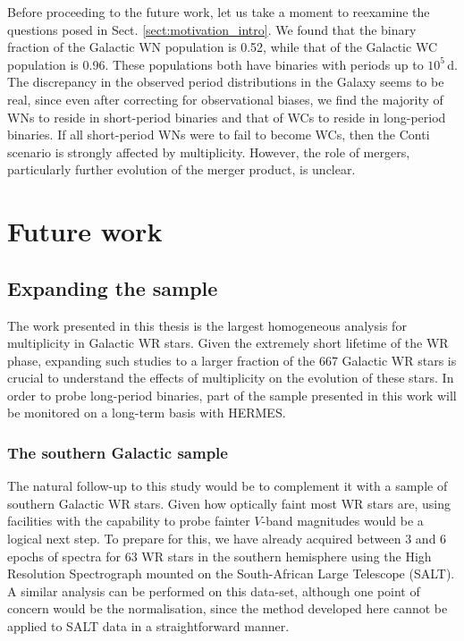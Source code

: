 Before proceeding to the future work, let us take a moment to reexamine the questions posed in Sect. \ref{sect:motivation_intro}. We found that the binary fraction of the Galactic WN population is 0.52, while that of the Galactic WC population is 0.96. These populations both have binaries with periods up to $10^5\,$d. The discrepancy in the observed period distributions in the Galaxy seems to be real, since even after correcting for observational biases, we find the majority of WNs to reside in short-period binaries and that of WCs to reside in long-period binaries. If all short-period WNs were to fail to become WCs, then the Conti scenario is strongly affected by multiplicity. However, the role of mergers, particularly further evolution of the merger product, is unclear. 

\section{Future work}

\subsection{Expanding the sample}

The work presented in this thesis is the largest homogeneous analysis for multiplicity in Galactic WR stars. Given the extremely short lifetime of the WR phase, expanding such studies to a larger fraction of the 667 Galactic WR stars is crucial to understand the effects of multiplicity on the evolution of these stars. In order to probe long-period binaries, part of the sample presented in this work will be monitored on a long-term basis with HERMES. 

\subsubsection{The southern Galactic sample}

The natural follow-up to this study would be to complement it with a sample of southern Galactic WR stars. Given how optically faint most WR stars are, using facilities with the capability to probe fainter $V$-band magnitudes would be a logical next step. To prepare for this, we have already acquired between 3 and 6 epochs of spectra for 63 WR stars in the southern hemisphere using the High Resolution Spectrograph mounted on the  South-African Large Telescope (SALT). A similar analysis can be performed on this data-set, although one point of concern would be the normalisation, since the method developed here cannot be applied to SALT data in a straightforward manner. 

